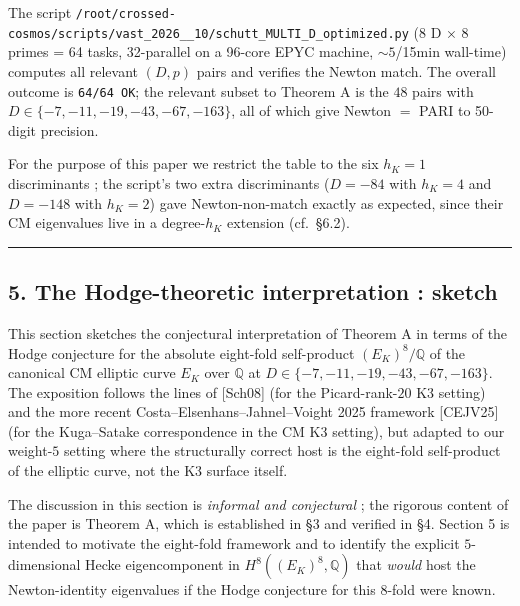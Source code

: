 \documentclass[
  11pt,
  a4paper,
]{amsart}
\begin{document}
The script \texttt{/root/crossed-cosmos/\allowbreak scripts/vast\_2026\_\_10/\allowbreak schutt\_MULTI\_D\_\allowbreak optimized.py} (8 D × 8 primes = 64 tasks, 32-parallel on a 96-core EPYC machine, \(\sim 5\)/15min wall-time) computes all relevant \((D, p)\) pairs and verifies the Newton match. The overall outcome is \texttt{64/64\ OK}; the relevant subset to Theorem A is the \(48\) pairs with \(D \in \{-7, -11, -19, -43, -67, -163\}\), all of which give Newton \(=\) PARI to 50-digit precision.

For the purpose of this paper we restrict the table to the six \(h_K = 1\) discriminants ; the script's two extra discriminants (\(D = -84\) with \(h_K = 4\) and \(D = -148\) with \(h_K = 2\)) gave Newton-non-match exactly as expected, since their CM eigenvalues live in a degree-\(h_K\) extension (cf.~§6.2).

\begin{center}\rule{0.5\linewidth}{0.5pt}\end{center}

\hypertarget{the-hodge-theoretic-interpretation-sketch}{%
\subsection{5. The Hodge-theoretic interpretation : sketch}\label{the-hodge-theoretic-interpretation-sketch}}

This section sketches the conjectural interpretation of Theorem A in terms of the Hodge conjecture for the absolute eight-fold self-product \((E_K)^8 / \mathbb{Q}\) of the canonical CM elliptic curve \(E_K\) over \(\mathbb{Q}\) at \(D \in \{-7, -11, -19, -43, -67, -163\}\). The exposition follows the lines of {[}Sch08{]} (for the Picard-rank-\(20\) K3 setting) and the more recent Costa--Elsenhans--Jahnel--Voight 2025 framework {[}CEJV25{]} (for the Kuga--Satake correspondence in the CM K3 setting), but adapted to our weight-\(5\) setting where the structurally correct host is the eight-fold self-product of the elliptic curve, not the K3 surface itself.

The discussion in this section is \emph{informal and conjectural} ; the rigorous content of the paper is Theorem A, which is established in §3 and verified in §4. Section 5 is intended to motivate the eight-fold framework and to identify the explicit \(5\)-dimensional Hecke eigencomponent in \(H^8((E_K)^8, \mathbb{Q})\) that \emph{would} host the Newton-identity eigenvalues if the Hodge conjecture for this \(8\)-fold were known.
\end{document}
